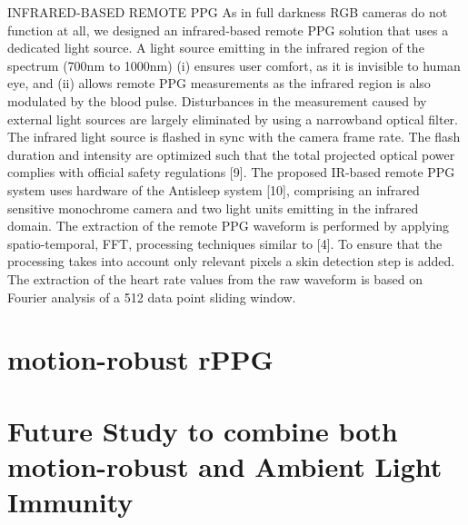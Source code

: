 INFRARED-BASED REMOTE PPG
As in full darkness RGB cameras do not function at all, we designed an infrared-based remote PPG solution that uses a dedicated light source. A light source emitting in the infrared region of the spectrum (700nm to 1000nm) (i) ensures user comfort, as it is invisible to human eye, and (ii) allows remote PPG measurements as the infrared region is also modulated by the blood pulse.  Disturbances in the measurement caused by external light sources are largely eliminated by using a narrowband optical filter. The infrared light source is flashed in sync with the camera frame rate. The flash duration and intensity are optimized such that the total projected optical power complies with official safety regulations [9]. The proposed IR-based remote PPG system uses hardware of the Antisleep system [10], comprising an infrared sensitive monochrome camera and two light units emitting in the infrared domain. The extraction of the remote PPG waveform is performed by applying spatio-temporal,  FFT, processing techniques similar to [4]. To
ensure that the processing takes into account only relevant pixels a skin detection step is added. The extraction of the heart rate values from the raw waveform is based on Fourier analysis of a 512 data point sliding window.

\section{motion-robust rPPG}

\section{Future Study to combine both motion-robust and Ambient Light Immunity}

